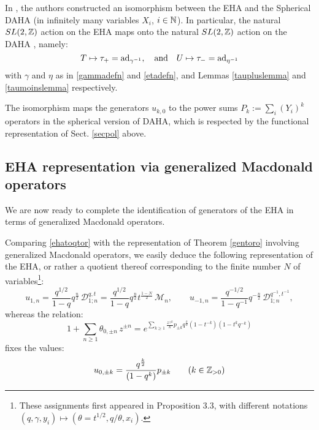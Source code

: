 In \cite{SHIVAS}, the authors constructed an isomorphism between the EHA and the Spherical DAHA 
(in infinitely many variables $X_i$, $i\in {\mathbb N}$). In particular, the natural $SL(2,{\mathbb Z})$ action on the EHA
maps onto the natural $SL(2,{\mathbb Z})$ action on the DAHA \cite{Cheredbook}, namely: 
$$T\mapsto \tau_+={\rm ad}_{\gamma^{-1}}, \quad {\rm and}\quad U\mapsto \tau_-={\rm ad}_{\eta^{-1}}$$
with $\gamma$ and $\eta$ as in \eqref{gammadefn} and \eqref{etadefn}, and Lemmas \ref{taupluslemma} and
\ref{taumoinslemma} respectively.

The isomorphism maps the generators $u_{k,0}$
to the power sums $P_k:=\sum_i (Y_i)^k$ operators in the spherical version of DAHA,
which is respected by the functional representation of Sect. \ref{secpol} above.

\subsection{EHA representation via generalized Macdonald operators}

We are now ready to complete the identification of generators of the EHA in terms of generalized 
Macdonald operators.


Comparing \eqref{ehatoqtor}
with the representation of Theorem \ref{gentoro} involving generalized Macdonald operators, 
we easily deduce the following representation of the EHA, or rather a quotient thereof corresponding 
to the finite number $N$ of variables\footnote{These assignments first appeared in \cite{Miki07} 
Proposition 3.3, with different notations $(q,\gamma,y_i)\mapsto (\theta=t^{1/2},q/\theta,x_i)$.}:
\begin{equation} u_{1,n}=\frac{q^{1/2}}{1-q} q^{\frac{n}{2}}\,{\mathcal D}_{1;n}^{q,t}
=\frac{q^{1/2}}{1-q} q^{\frac{n}{2}}t^{\frac{1-N}{2}}\,{\mathcal M}_{n},\qquad   
u_{-1,n}=\frac{q^{-1/2}}{1-q^{-1}} q^{-\frac{n}{2}}\,{\mathcal D}_{1;n}^{q^{-1},t^{-1}},
\end{equation}
whereas the relation:
$$
1+\sum_{n\geq 1} \theta_{0,\pm n}\, z^{\pm n}
=e^{\sum_{k\geq 1} \frac{z^{\pm k}}{k}p_{\pm k} q^{\frac{k}{2}}(1-t^{-k})(1-t^kq^{-k})}
$$
fixes the values:
\begin{equation} u_{0,\pm k}= \frac{q^{\frac{k}{2}}}{(1-q^k)} p_{\pm k}\qquad (k\in {\mathbb Z}_{>0})
\end{equation}

